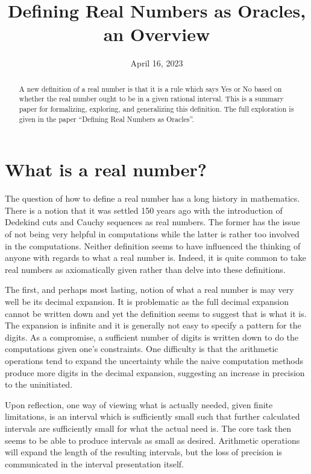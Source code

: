 \documentclass[12pt]{article}
\title{Defining Real Numbers as Oracles, an Overview}
\date{April 16, 2023}
\begin{document}
\maketitle
\begin{abstract}
A new definition of a real number is that it is a rule which says Yes or No based on whether the real number ought to be in a given rational interval. This is a summary paper for formalizing, exploring, and generalizing this definition. The full exploration is given in the paper ``Defining Real Numbers as Oracles''. 
\end{abstract}



\section{What is a real number?}

The question of how to define a real number has a long history in mathematics. There is a notion that it was settled 150 years ago with the introduction of Dedekind cuts and Cauchy sequences as real numbers. The former has the issue of not being very helpful in computations while the latter is rather too involved in the computations. Neither definition seems to have influenced the thinking of anyone with regards to what a real number is. Indeed, it is quite common to take real numbers as axiomatically given rather than delve into these definitions.

The first, and perhaps most lasting, notion of what a real number is may very well be its decimal expansion. It is problematic as the full decimal expansion cannot be written down and yet the definition seems to suggest that is what it is. The expansion is infinite and it is generally not easy to specify a pattern for the digits. As a compromise, a sufficient number of digits is written down to do the computations given one's constraints. One difficulty is that the arithmetic operations tend to expand the uncertainty while the naive computation methods produce more digits in the decimal expansion, suggesting an increase in precision to the uninitiated.

Upon reflection, one way of viewing what is actually needed, given finite limitations, is an interval which is sufficiently small such that further calculated intervals are sufficiently small for what the actual need is. The core task then seems to be able to produce intervals as small as desired. Arithmetic operations will expand the length of the resulting intervals, but the loss of precision is communicated in the interval presentation itself. 
\end{document}

